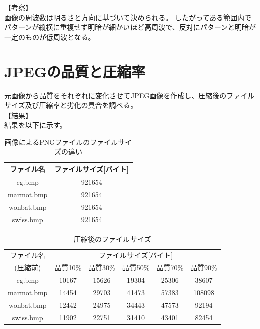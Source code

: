 \documentclass[uplatex, titlepage]{jsarticle}
\begin{document}
【考察】\\
  画像の周波数は明るさと方向に基づいて決められる。
  したがってある範囲内でパターンが縦横に重複せず明暗が細かいほど高周波で、反対にパターンと明暗が一定のものが低周波となる。\\

\section{JPEGの品質と圧縮率}

  元画像から品質をそれぞれに変化させてJPEG画像を作成し、圧縮後のファイルサイズ及び圧縮率と劣化の具合を調べる。\\
【結果】\\
  結果を以下に示す。

\begin{table}
  \centering
  \caption{画像によるPNGファイルのファイルサイズの違い}
  \label{table:filesizemae}
  \begin{tabular}{|c|c|} \hline
    ファイル名 & ファイルサイズ[バイト] \\ \hline
    cg.bmp & 921654  \\ \hline
    marmot.bmp & 921654 \\ \hline
    wonbat.bmp & 921654 \\ \hline
    swiss.bmp & 921654 \\ \hline
  \end{tabular}
\end{table}

\begin{table}
  \centering
  \caption{圧縮後のファイルサイズ}
  \label{table:filesizeato}
  \begin{tabular}{|c|c|c|c|c|c|} \hline
    ファイル名 & \multicolumn{5}{|c|}{ファイルサイズ[バイト]} \\ \cline{2-6}
    (圧縮前) & 品質10\% & 品質30\% & 品質50\% & 品質70\% & 品質90\% \\ \hline
    cg.bmp & 10167 & 15626 & 19304 & 25306 & 38607  \\ \hline
    marmot.bmp & 14454 & 29703 & 41473 & 57383 & 108098 \\ \hline
    wonbat.bmp & 12442 & 24975 & 34443 & 47573 & 92194  \\ \hline
    swiss.bmp & 11902 & 22751 & 31410 & 43401 & 82454  \\ \hline
  \end{tabular}
\end{table}
\end{document}
